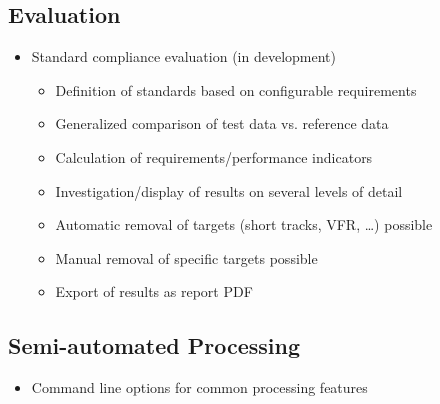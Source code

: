 \subsection{Evaluation}    
\begin{itemize}  
    \item Standard compliance evaluation (in development)
    \begin{itemize}  
        \item Definition of standards based on configurable requirements
        \item Generalized comparison of test data vs. reference data
        \item Calculation of requirements/performance indicators
        \item Investigation/display of results on several levels of detail
        \item Automatic removal of targets (short tracks, VFR, …) possible
        \item Manual removal of specific targets possible
        \item Export of results as report PDF
    \end{itemize}
\end{itemize}

\subsection{Semi-automated Processing}    
\begin{itemize}  
    \item Command line options for common processing features
\end{itemize}

